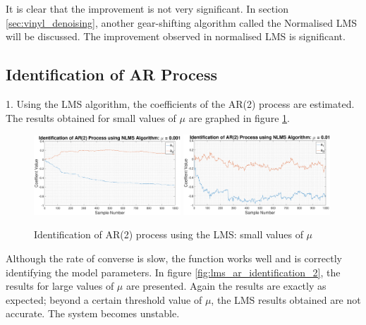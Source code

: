 \documentclass{article}
\begin{document}
It is clear that the improvement is not very significant. In section \ref{sec:vinyl_denoising}, another gear-shifting algorithm called the Normalised LMS will be discussed. The improvement observed in normalised LMS is significant. 

\newpage
\subsection{Identification of AR Process}\label{sec:ar_identify}
1. Using the LMS algorithm, the coefficients of the AR(2) process are estimated. The results obtained for small values of $\mu$ are graphed in figure \ref{fig:lms_ar_identification_1}. 

\begin{figure}[H]
    \centering
    \includegraphics[width=0.49\textwidth]{lms_ar_identification_mu_point_001}
    \includegraphics[width=0.49\textwidth]{lms_ar_identification_mu_point_01}
    \caption{Identification of AR(2) process using the LMS: small values of $\mu$}
    \label{fig:lms_ar_identification_1}
\end{figure}

Although the rate of converse is slow, the function works well and is correctly identifying the model parameters. In figure \ref{fig:lms_ar_identification_2}, the results for large values of $\mu$ are presented. Again the results are exactly as expected; beyond a certain threshold value of $\mu$, the LMS results obtained are not accurate. The system becomes unstable. 
\end{document}
